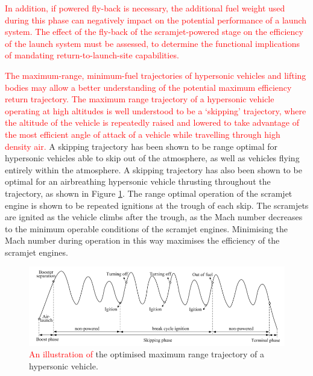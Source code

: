 \textcolor{red}{In addition, if powered fly-back is necessary, the additional fuel weight used during this phase can negatively impact on the potential performance of a launch system. The effect of the fly-back of the scramjet-powered stage on the efficiency of the launch system must be assessed, to determine the functional implications of mandating return-to-launch-site capabilities. }

\textcolor{red}{
The maximum-range, minimum-fuel trajectories of hypersonic vehicles and lifting bodies may allow a better understanding of the potential maximum efficiency return trajectory. The maximum range trajectory of a hypersonic vehicle operating at high altitudes is well understood to be a `skipping' trajectory, where the altitude of the vehicle is repeatedly raised and lowered to take advantage of the most efficient angle of attack of a vehicle while travelling through high density air\cite{Moshman2014,Darby2011,Toso2015,Chai2015}.} A skipping trajectory has been shown to be range optimal for hypersonic vehicles able to skip out of the atmosphere\cite{Eggers1957,Moshman2014}, as well as vehicles flying entirely within the atmosphere\cite{Moshman2014,Darby2011,Toso2015,Tetlow1992}. A skipping trajectory has also been shown to be optimal for an airbreathing hypersonic vehicle thrusting throughout the trajectory\cite{Kanda2007,Chai2015}, as shown in Figure \ref{fig:chai-boostskip}. The range optimal operation of the scramjet engine is shown to be repeated ignitions at the trough of each skip\cite{Chai2015}. The scramjets are ignited as the vehicle climbs after the trough, as the Mach number decreases to the minimum operable conditions of the scramjet engines\cite{Chai2015}. Minimising the Mach number during operation in this way maximises the efficiency of the scramjet engines\cite{Chai2015}.
 \begin{figure}[ht]
 	\centering
 	\includegraphics[width=0.9\linewidth]{"figures/2_literature-review/chai-boost skip"}
 	\caption{\textcolor{red}{An illustration of }the optimised maximum range trajectory of a hypersonic vehicle\cite{Chai2015}.}
 	\label{fig:chai-boostskip}
 \end{figure}

